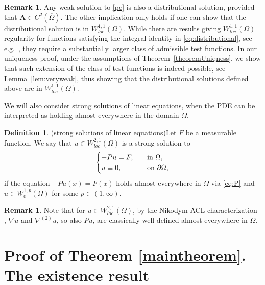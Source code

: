 \documentclass[12pt,a4paper]{amsart}
\theoremstyle{definition}
\newtheorem{remark}[theorem]{\bf Remark}
\newtheorem{definition}[theorem]{\bf Definition}
\newcommand{\A}{\mathbf{A}}
\begin{document}
\begin{remark}\label{rem:weakdist}
Any weak solution to \eqref{pe} is also a distributional solution, provided that $\A\in C^2(\overline{\Omega})$. The other implication only holds if one can show that the distributional solution is in $W^{1,1}_{loc}(\Omega)$. While there are results giving $W^{1,1}_{loc}(\Omega)$ regularity for functions satisfying the integral identity in \eqref{eq:distributional}, see e.g.~\cite[Corollary~2.9]{MR2103694}, they require a substantially larger class of admissible test functions. In our uniqueness proof, under the assumptions of Theorem~\ref{theoremUniqness}, we show that such extension of the class of test functions is indeed possible, see Lemma~\ref{lem:veryweak}, thus showing that the distributional solutions defined above are in $W^{1,1}_{loc}(\Omega)$. 
\end{remark}


We will also consider strong solutions of linear equations, when the PDE can be interpreted as holding almost everywhere in the domain $\Omega$.


\begin{definition}{\rm (strong solutions of linear equations)}\label{defStrongSol} Let $F$ be a measurable function. We say that $u\in W^{2,1}_{loc}(\Omega)$ is a strong solution to 
\begin{align}\label{eq:linearstrong}
\begin{cases}
    -Pu = F,\quad &\textnormal{in}\ \Omega,\\
    u\equiv0,\quad &\textnormal{on}\ \partial\Omega,
\end{cases}
\end{align}
    if the equation $-Pu(x) = F(x)$ holds almost everywhere in $\Omega$ via \eqref{eq:P} and $u \in W^{1,p}_0(\Omega)$ for some $p\in (1,\infty)$.
    
\end{definition}
\begin{remark}
    Note that for $u\in W^{2,1}_{loc}(\Omega)$, by the Nikodym ACL characterization \cite[Section~1.1.3]{MR2777530}, $\nabla u$ and  $\nabla^{(2)}u$, so also $Pu$, are classically well-defined almost everywhere in $\Omega$.
\end{remark}


\section{Proof of Theorem \ref{maintheorem}. The existence result}\label{sec:existenceproof}
\end{document}
